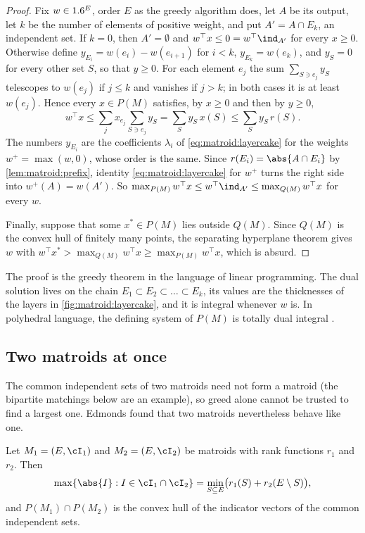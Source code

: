 \begin{refsection}
\begin{proof}
Fix $w\in1.6^E$, order $E$ as the greedy algorithm does, let $A$ be its output, let $k$ be the number of elements of positive weight, and put $A'=A\cap E_k$, an independent set. If $k=0$, then $A'=\emptyset$ and $w^{\top}x\le0=w^{\top}\ind_{A'}$ for every $x\ge0$. Otherwise define $y_{E_i}=w(e_i)-w(e_{i+1})$ for $i<k$, $y_{E_k}=w(e_k)$, and $y_S=0$ for every other set $S$, so that $y\ge0$. For each element $e_j$ the sum $\sum_{S\ni e_j}y_S$ telescopes to $w(e_j)$ if $j\le k$ and vanishes if $j>k$; in both cases it is at least $w(e_j)$. Hence every $x\in P(M)$ satisfies, by $x\ge0$ and then by $y\ge0$,
\[
w^{\top}x\le\sum_{j}x_{e_j}\sum_{S\ni e_j}y_S=\sum_{S}y_S\,x(S)\le\sum_{S}y_S\,r(S).
\]
The numbers $y_{E_i}$ are the coefficients $\lambda_i$ of \cref{eq:matroid:layercake} for the weights $w^+=\max(w,0)$, whose order is the same. Since $r(E_i)=\abs{A\cap E_i}$ by \cref{lem:matroid:prefix}, identity \cref{eq:matroid:layercake} for $w^+$ turns the right side into $w^+(A)=w(A')$. So $\max_{P(M)}w^{\top}x\le w^{\top}\ind_{A'}\le\max_{Q(M)}w^{\top}x$ for every $w$.

Finally, suppose that some $x^*\in P(M)$ lies outside $Q(M)$. Since $Q(M)$ is the convex hull of finitely many points, the separating hyperplane theorem gives $w$ with $w^{\top}x^*>\max_{Q(M)}w^{\top}x\ge\max_{P(M)}w^{\top}x$, which is absurd.
\end{proof}

The proof is the greedy theorem in the language of linear programming. The dual solution lives on the chain $E_1\subset E_2\subset\dots\subset E_k$, its values are the thicknesses of the layers in \cref{fig:matroid:layercake}, and it is integral whenever $w$ is. In polyhedral language, the defining system of $P(M)$ is totally dual integral \parencite[Chapter~40]{Schrijver2003}.

\subsection{Two matroids at once}\label{sec:matroid:intersection}

The common independent sets of two matroids need not form a matroid (the bipartite matchings below are an example), so greed alone cannot be trusted to find a largest one. Edmonds found that two matroids nevertheless behave like one.

\begin{theorem}\label{thm:matroid:intersection}
Let $M_1=(E,\cI_1)$ and $M_2=(E,\cI_2)$ be matroids with rank functions $r_1$ and $r_2$. Then
\[
\max\{\abs{I} : I\in\cI_1\cap\cI_2\}=\min_{S\subseteq E}\bigl(r_1(S)+r_2(E\setminus S)\bigr),
\]
and $P(M_1)\cap P(M_2)$ is the convex hull of the indicator vectors of the common independent sets.
\end{theorem}


\end{refsection}
